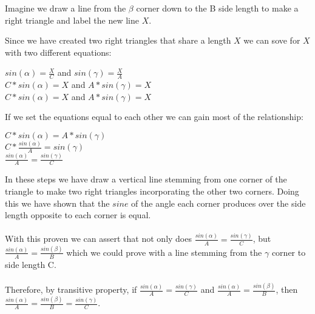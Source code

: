 \documentclass{article}
\begin{document}
Imagine we draw a line from the $\beta$ corner down to the B side length to make a right triangle and label the new line $X$.\\
\begin{center}
\end{center}
Since we have created two right triangles that share a length $X$ we can sove for $X$ with two different equations:
\begin{center}
    $sin(\alpha)=\frac{X}{C}$ and $sin(\gamma)=\frac{X}{A}$\\
    $C*sin(\alpha)=X$ and $A*sin(\gamma)=X$\\
    $C*sin(\alpha)=X$ and $A*sin(\gamma)=X$\\
\end{center}
If we set the equations equal to each other we can gain most of the relationship:
\begin{center}
    $C*sin(\alpha) = A*sin(\gamma)$\\
    $C*\frac{sin(\alpha)}{A} = sin(\gamma)$\\
    $\frac{sin(\alpha)}{A} = \frac{sin(\gamma)}{C}$\\
\end{center}
In these steps we have draw a vertical line stemming from one corner of the triangle to make two right triangles incorporating the other two corners. Doing this we have shown that the $sine$ of the angle each corner produces over the side length opposite to each corner is equal.\\
\\
With this proven we can assert that not only does $\frac{sin(\alpha)}{A} = \frac{sin(\gamma)}{C}$, but $\frac{sin(\alpha)}{A} = \frac{sin(\beta)}{B}$ which we could prove with a line stemming from the $\gamma$ corner to side length C.\\
\\
Therefore, by transitive property, if $\frac{sin(\alpha)}{A} = \frac{sin(\gamma)}{C}$ and $\frac{sin(\alpha)}{A} = \frac{sin(\beta)}{B}$, then $\frac{sin(\alpha)}{A} = \frac{sin(\beta)}{B} = \frac{sin(\gamma)}{C}$.\\
\begin{flushright}
\end{flushright}
\end{document}
